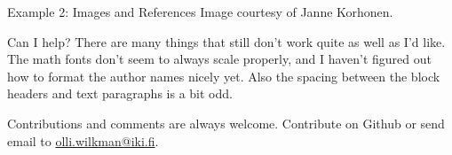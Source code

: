 \documentclass[final]{beamer}
\begin{document}
\begin{frame}[t, fragile]
\begin{columns}[T]
\begin{column}{0.32\linewidth}
\begin{block}{Example 2: Images and References}
Image courtesy of Janne Korhonen.
\end{block}

\begin{block}{Can I help?}
There are many things that still don't work quite as well as I'd like. The math fonts don't seem to always scale properly, and I haven't figured out how to format the author names nicely yet. Also the spacing between the block headers and text paragraphs is a bit odd.

Contributions and comments are always welcome. Contribute on Github or send email to \url{olli.wilkman@iki.fi}.
\end{block}
	
\end{column}

\end{columns}
\end{frame}
\end{document}

